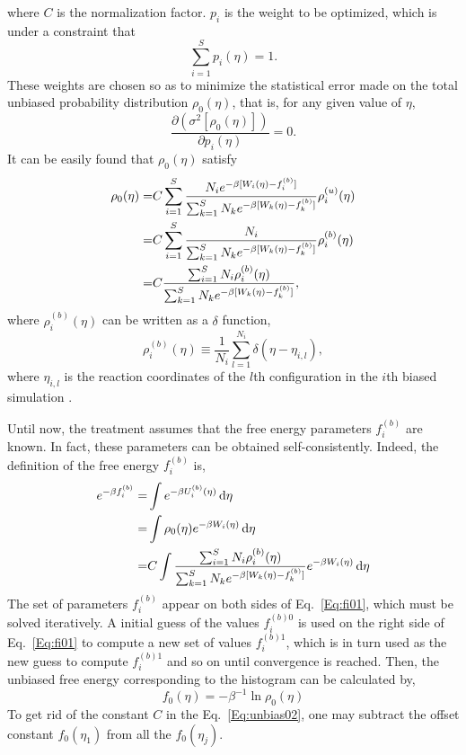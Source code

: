 where $C$ is the normalization factor. $p_i$ is the weight to be optimized, which is under a constraint that
\begin{equation}
\sum_{i=1}^{S}p_{i}(\eta)=1.
\label{Eq:p1}
\end{equation}
These weights are chosen so as to minimize the statistical error made on the total unbiased probability distribution $\rho_{0}(\eta)$, that is, for any given value of $\eta$,
\begin{equation}
\frac{\partial(\sigma^2[\rho_{0}(\eta)])}{\partial p_{i}(\eta)}=0.
\label{Eq:partialp}
\end{equation} 
It can be easily found that $\rho_{0}(\eta)$ satisfy
\begin{align}
\rho_{0}(\eta) = & C\sum_{i=1}^{S}\frac{N_{i}e^{-\beta[W_{i}(\eta)-f_{i}^{(b)}]}}{\sum_{k=1}^{S}N_{k}e^{-\beta[W_{k}(\eta)-f_{k}^{(b)}]}}\rho_{i}^{(u)}(\eta) \notag\\
= & C\sum_{i=1}^{S}\frac{N_{i}}{\sum_{k=1}^{S}N_{k}e^{-\beta[W_{k}(\eta)-f_{k}^{(b)}]}}\rho_{i}^{(b)}(\eta) \notag\\
= & C\frac{\sum_{i=1}^{S}N_{i}\rho_{i}^{(b)}(\eta)}{\sum_{k=1}^{S}N_{k}e^{-\beta[W_{k}(\eta)-f_{k}^{(b)}]}},
\label{Eq:unbias02}
\end{align} 
where $\rho_{i}^{(b)}(\eta)$ can be written as a $\delta$ function,
\begin{equation}
\rho_{i}^{(b)}(\eta) \equiv \frac{1}{N_{i}} \sum_{l=1}^{N_{i}} \delta {(\eta-\eta_{i,l})},
\label{Eq:delta01}
\end{equation} 
where $\eta_{i,l}$ is the reaction coordinates of the $l$th configuration in the $i$th biased simulation .

Until now, the treatment assumes that the free energy parameters ${f_{i}^{(b)}}$ are known. In fact, these parameters can be obtained self-consistently. Indeed, the definition of the free energy $f_{i}^{(b)}$ is,
\begin{align}
e^{-\beta f_{i}^{(b)}}=&\int e^{-\beta U_{i}^{(b)}(\eta) } \mathop{}\!\mathrm{d}\eta \notag\\
=&\int \rho_{0}(\eta) e^{-\beta W_{i}(\eta)} \mathop{}\!\mathrm{d}\eta \notag\\
=&C \int \frac{\sum_{i=1}^{S}N_{i}\rho_{i}^{(b)}(\eta)}{\sum_{k=1}^{S}N_{k}e^{-\beta[W_{k}(\eta)-f_{k}^{(b)}]}}e^{-\beta W_{i}(\eta)}  \mathop{}\!\mathrm{d}\eta
\label{Eq:fi01}
\end{align} 
The set of parameters ${f_{i}^{(b)}}$ appear on both sides of Eq.~\ref{Eq:fi01}, which must be solved iteratively. A initial guess of the values ${f_{i}^{(b)0}}$ is used on the right side of Eq.~\ref{Eq:fi01} to compute a new set of values ${f_{i}^{(b)1}}$, which is in turn used as the new guess to compute ${f_{i}^{(b)1}}$ and so on until convergence is reached. Then, the unbiased free energy corresponding to the histogram can be calculated by,
\begin{equation}
f_{0}(\eta)=-\beta^{-1}\ln \rho_{0}(\eta) 
\label{Eq:f0}
\end{equation} 
To get rid of the constant $C$ in the Eq.~\ref{Eq:unbias02}, one may subtract the offset constant $f_{0}(\eta_{1})$ from all the $f_{0}(\eta_{j})$.  


